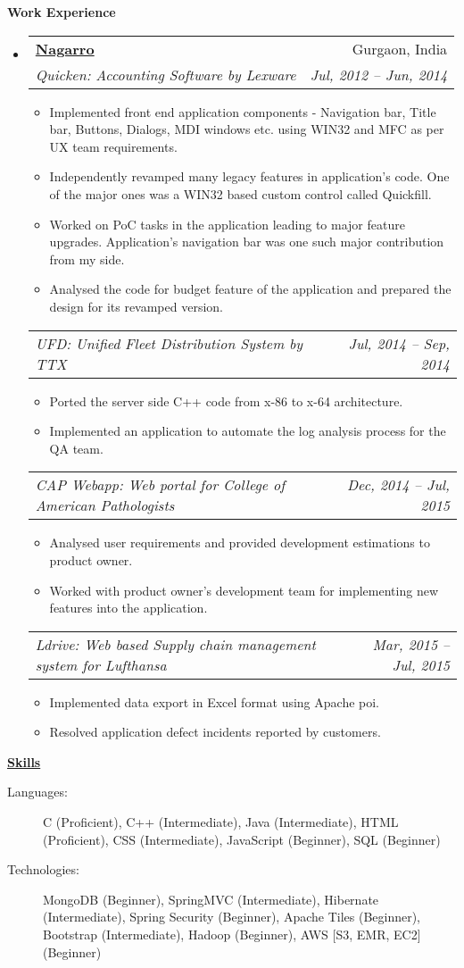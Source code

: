 \documentclass[letterpaper,11pt]{article}
\makeatletter
\newcommand{\resitem}[1]{\item #1 \vspace{-2.2pt}}
\newcommand{\resheading}[1]{{\large \colorbox{mygrey}{\begin{minipage}{\textwidth}{\textbf{#1 \vphantom{p\^{E}}}}\end{minipage}}}}
\newcommand{\ressubheading}[4]{
\begin{tabular*}{6.5in}{l@{\extracolsep{\fill}}r}
		\textbf{#1} & #2 \\
		\textit{#3} & \textit{#4} \\
\end{tabular*}\vspace{-6pt}}
\newcommand{\ressubsubheading}[2]{
\begin{tabular*}{6.5in}{l@{\extracolsep{\fill}}r}
		\textit{#1} & \textit{#2} \\
\end{tabular*}\vspace{-6pt}}
\makeatother
\begin{document}
\resheading{Work Experience}
	\begin{itemize}
		\item 
			\ressubheading{\href{http://www.nagarro.com/}{Nagarro}}{Gurgaon, India}
				{Quicken: Accounting Software by Lexware}{Jul, 2012 -- Jun, 2014}
				{ \footnotesize
				\begin{itemize}
					\resitem{Implemented front end application components - Navigation bar, Title bar, Buttons, Dialogs, MDI windows etc. using WIN32 and MFC as per UX team requirements.}
					\resitem{Independently revamped many legacy features in application's code. One of the major ones was a WIN32 based custom control called Quickfill.}
					\resitem{Worked on PoC tasks in the application leading to major feature upgrades. Application's navigation bar was one such major contribution from my side.}
					\resitem{Analysed the code for budget feature of the application and prepared the design for its revamped version.}
				\end{itemize}
				}

			\ressubsubheading{UFD: Unified Fleet Distribution System by TTX}{Jul, 2014 -- Sep, 2014}
				{ \footnotesize
				\begin{itemize}
					\resitem{Ported the server side C++ code from x-86 to x-64 architecture.}
					\resitem{Implemented an application to automate the log analysis process for the QA team.}
				\end{itemize}
				}

			\ressubsubheading{CAP Webapp: Web portal for College of American Pathologists}{Dec, 2014 -- Jul, 2015}
				{ \footnotesize
				\begin{itemize}
					\resitem{Analysed user requirements and provided development estimations to product owner.}
					\resitem{Worked with product owner's development team for implementing new features into the application.}
					\end{itemize}
				}			

			\ressubsubheading{Ldrive: Web based Supply chain management system for Lufthansa}{Mar, 2015 -- Jul, 2015}
				{ \footnotesize
				\begin{itemize}
					\resitem{Implemented data export in Excel format using Apache poi.}
					\resitem{Resolved application defect incidents reported by customers.}
				\end{itemize}
				}				
	\end{itemize}  %

\resheading{\href{http://www.ashish-jindal.com/}{Skills}}
	\begin{description}
		\item[Languages:] { \footnotesize C (Proficient), C++ (Intermediate), Java (Intermediate), HTML (Proficient), CSS (Intermediate), JavaScript (Beginner), SQL (Beginner)
		}
		\item[Technologies:] { \footnotesize
			MongoDB (Beginner), SpringMVC (Intermediate), Hibernate (Intermediate), Spring Security (Beginner), Apache Tiles (Beginner), Bootstrap (Intermediate), Hadoop (Beginner), AWS [S3, EMR, EC2] (Beginner)
		}

	\end{description} %
\end{document}
